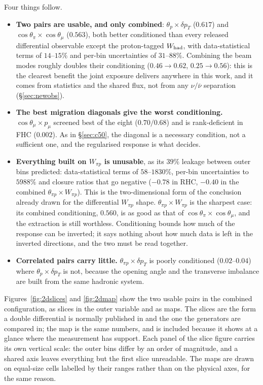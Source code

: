 Four things follow.
\begin{itemize}\itemsep2pt
  \item \textbf{Two pairs are usable, and only combined}: $\theta_p\times\delta p_T$ ($0.617$) and
    $\cos\theta_\pi\times\cos\theta_\mu$ ($0.563$), both better conditioned than every released
    differential observable except the proton-tagged $W_{\rm had}$, with data-statistical terms of
    $14$--$15\%$ and per-bin uncertainties of $31$--$88\%$. Combining the beam modes roughly doubles
    their conditioning ($0.46\to0.62$, $0.25\to0.56$): this is the clearest benefit the joint
    exposure delivers anywhere in this work, and it comes from statistics and the shared flux, not
    from any $\nu/\bar\nu$ separation (\S\ref{sec:newobs}).
  \item \textbf{The best migration diagonals give the worst conditioning.} $\cos\theta_\mu\times p_\mu$
    screened best of the eight ($0.70/0.68$) and is rank-deficient in FHC ($0.002$). As in
    \S\ref{sec:c50}, the diagonal is a necessary condition, not a sufficient one, and the
    regularised response is what decides.
  \item \textbf{Everything built on $W_{\pi p}$ is unusable}, as its $39\%$ leakage between outer
    bins predicted: data-statistical terms of $58$--$1830\%$, per-bin uncertainties to $5988\%$ and
    closure ratios that go negative ($-0.78$ in RHC, $-0.40$ in the combined
    $\theta_{\pi p}\times W_{\pi p}$). This is the two-dimensional form of the conclusion already
    drawn for the differential $W_{\pi p}$ shape. $\theta_{\pi p}\times W_{\pi p}$ is the sharpest
    case: its combined conditioning, $0.560$, is as good as that of
    $\cos\theta_\pi\times\cos\theta_\mu$, and the extraction is still worthless. Conditioning bounds
    how much of the response can be inverted; it says nothing about how much data is left in the
    inverted directions, and the two must be read together.
  \item \textbf{Correlated pairs carry little.} $\theta_{\pi p}\times\delta p_T$ is poorly
    conditioned ($0.02$--$0.04$) where $\theta_p\times\delta p_T$ is not, because the opening angle
    and the transverse imbalance are built from the same hadronic system.
\end{itemize}

Figures~\ref{fig:2dslices} and \ref{fig:2dmap} show the two usable pairs in the combined
configuration, as slices in the outer variable and as maps. The slices are the form a double
differential is normally published in and the one the generators are compared in; the map is the same
numbers, and is included because it shows at a glance where the measurement has support. Each panel of
the slice figure carries its own vertical scale: the outer bins differ by an order of magnitude, and a
shared axis leaves everything but the first slice unreadable. The maps are drawn on equal-size cells
labelled by their ranges rather than on the physical axes, for the same reason.

